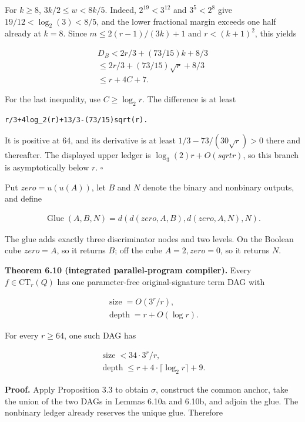 \documentclass[
  11pt,
]{article}
\theoremstyle{definition}
\theoremstyle{remark}
\begin{document}
For \(k\ge 8\), \(3k/2\le w<8k/5\). Indeed, \(2^19<3^12\) and
\(3^5<2^8\) give \(19/12<\log_2(3)<8/5\), and the lower fractional
margin exceeds one half already at \(k=8\). Since \(m\le 2(r-1)/(3k)+1\)
and \(r<(k+1)^2\), this yields

\[
\begin{aligned}
D_B < 2r/3+(73/15)k+8/3 \\
\le  2r/3+(73/15)\sqrt{r}+8/3 \\
\le  r+4C+7.
\end{aligned}
\]

For the last inequality, use \(C\ge \log_2 r\). The difference is at
least

\begin{lstlisting}
r/3+4log_2(r)+13/3-(73/15)sqrt(r).
\end{lstlisting}

It is positive at 64, and its derivative is at least
\(1/3-73/(30\sqrt{r})>0\) there and thereafter. The displayed upper
ledger is \(\log_3(2)r+O(sqrt r)\), so this branch is asymptotically
below \(r\). \(\square\)

Put \(zero=u(u(A))\), let \(B\) and \(N\) denote the binary and
nonbinary outputs, and define

\[
\begin{aligned}
\operatorname{Glue}(A,B,N)=d(d(zero,A,B),d(zero,A,N),N).
\end{aligned}
\]

The glue adds exactly three discriminator nodes and two levels. On the
Boolean cube \(zero=A\), so it returns \(B\); off the cube
\(A=2,zero=0\), so it returns \(N\).

\textbf{Theorem 6.10 (integrated parallel-program compiler).} Every
\(f \in \mathrm{CT}_r(Q)\) has one parameter-free original-signature
term DAG with

\[
\begin{aligned}
\operatorname{size}  = O(3^r/r), \\
\operatorname{depth} = r+O(\log r).
\end{aligned}
\]

For every \(r\ge 64\), one such DAG has

\[
\begin{aligned}
\operatorname{size}  < 34\mathbin{\cdot}3^r/r, \\
\operatorname{depth} \le  r+4\mathbin{\cdot}\lceil \log_2 r \rceil+9.
\end{aligned}
\]

\textbf{Proof.} Apply Proposition 3.3 to obtain \(\sigma\), construct
the common anchor, take the union of the two DAGs in Lemmas 6.10a and
6.10b, and adjoin the glue. The nonbinary ledger already reserves the
unique glue. Therefore
\end{document}
